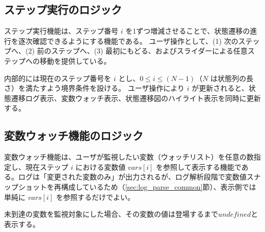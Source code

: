 \documentclass[12pt]{jreport}
\begin{document}
\subsection{ステップ実行のロジック}
\label{sec:step_execution}
\begin{par}
ステップ実行機能は、ステップ番号 $i$ を1ずつ増減させることで、状態遷移の進行を逐次確認できるようにする機能である。
ユーザ操作として、(1) 次のステップへ、(2) 前のステップへ、(3) 最初にもどる、およびスライダーによる任意ステップへの移動を提供している。
\end{par}

\begin{par}
内部的には現在のステップ番号を $i$ とし、$0 \le i \le (N-1)$（$N$ は状態列の長さ）を満たすよう境界条件を設ける。
ユーザ操作により $i$ が更新されると、状態遷移ログ表示、変数ウォッチ表示、状態遷移図のハイライト表示を同時に更新する。
\end{par}


\subsection{変数ウォッチ機能のロジック}
\label{sec:var_watch}
\begin{par}
変数ウォッチ機能は、ユーザが監視したい変数（ウォッチリスト）を任意の数指定し、現在ステップ $i$ における変数値 $vars[i]$ を参照して表示する機能である。ログは「変更された変数のみ」が出力されるが、ログ解析段階で変数値スナップショットを再構成しているため（\ref{sec:log_parse_common}節）、表示側では単純に $vars[i]$ を参照するだけでよい。
\end{par}

\begin{par}
未到達の変数を監視対象にした場合、その変数の値は登場するまで$undefined$と表示する。
\end{par}



\end{document}
